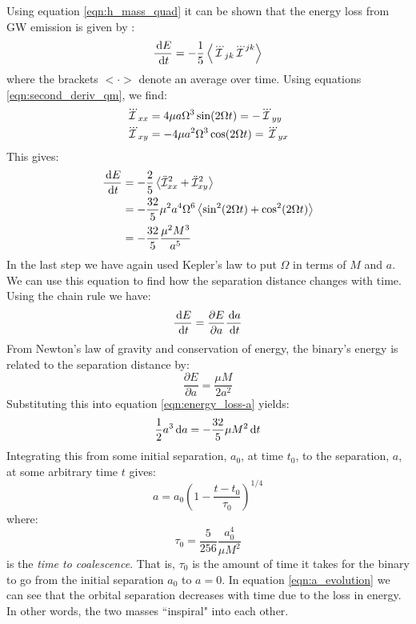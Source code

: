 Using equation \ref{eqn:h_mass_quad} it can be shown that the energy loss from \ac{GW} emission is given by \cite{BlanfordThorne}:
\begin{equation}
\label{eqn:energy_loss-t}
\frac{\d E}{\d t} = -\frac{1}{5}\left< \dddot{\qI}_{jk} \dddot{\qI}^{jk} \right>
\end{equation}
where the brackets $<\cdot>$ denote an average over time. Using equations \ref{eqn:second_deriv_qm}, we find:
\begin{align*}
\dddot{\mathcal{I}}_{xx} &= 4 \mu a \Omega^3\sin(2\Omega t) = -\dddot{\mathcal{I}}_{yy} \\
\dddot{\mathcal{I}}_{xy} &= -4 \mu a^2 \Omega^3\cos(2\Omega t) = \dddot{\mathcal{I}}_{yx}
\end{align*}
This gives:
\begin{align*}
\frac{\,\mathrm{d} E}{\,\mathrm{d} t} &= -\frac{2}{5}\left< \ddot{\mathcal{I}}_{xx}^2 + \ddot{\mathcal{I}}_{xy}^2 \right> \\
    &= -\frac{32}{5} \mu^2 a^4 \Omega^6 \left< \sin^2(2\Omega t) + \cos^2(2\Omega t) \right> \\
    &= -\frac{32}{5} \frac{\mu^2 M^3}{a^5}
\end{align*}
In the last step we have again used Kepler's law to put $\Omega$ in terms of $M$ and $a$. We can use this equation to find how the separation distance changes with time. Using the chain rule we have:
\begin{equation}
\label{eqn:energy_loss-a}
\frac{\d E}{\d t} = \frac{\partial E}{\partial a}\frac{\d a}{\d t}
\end{equation}
From Newton's law of gravity and conservation of energy, the binary's energy is related to the separation distance by:
\begin{equation*}
\frac{\partial E}{\partial a} = \frac{\mu M}{2a^2}
\end{equation*}
Substituting this into equation \ref{eqn:energy_loss-a} yields:
\begin{equation*}
\frac{1}{2} a^3 \,\mathrm{d} a = -\frac{32}{5} \mu M^2 \,\mathrm{d} t
\end{equation*}
Integrating this from some initial separation, $a_0$, at time $t_0$, to the separation, $a$, at some arbitrary time $t$ gives:
\begin{equation}
\label{eqn:a_evolution}
a = a_0 \left(1 - \frac{t-t_0}{\tau_0} \right)^{1/4}
\end{equation}
where:
\begin{equation}
\label{eqn:tau_0-a}
\tau_0 = \frac{5}{256} \frac{a_0^4}{\mu M^2}
\end{equation}
is the \emph{time to coalescence}. That is, $\tau_0$ is the amount of time it takes for the binary to go from the initial separation $a_0$ to $a=0$. In equation \ref{eqn:a_evolution} we can see that the orbital separation decreases with time due to the loss in energy. In other words, the two masses ``inspiral" into each other.

